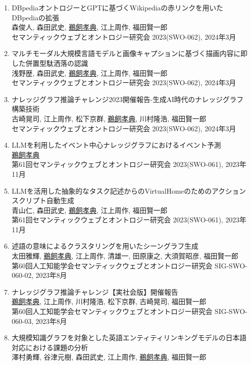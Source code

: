 \documentclass[dvipdfmx]{jlreq}
\begin{document}
\begin{enumerate}
\begin{enumerate}
\begin{enumerate}[label=\arabic*,align=right, labelsep=3pt]
2024年度人工知能学会全国大会論文集（第38回）, 2024年5月
\item DBpediaオントロジーとGPTに基づくWikipediaの赤リンクを用いたDBpediaの拡張\\
森俊人, 森田武史, \underline{鵜飼孝典}, 江上周作, 福田賢一郎\\
セマンティックウェブとオントロジー研究会 2023(SWO-062), 2024年3月
\item マルチモーダル大規模言語モデルと画像キャプションに基づく描画内容に即した併置型駄洒落の認識\\
浅野歴, 森田武史, \underline{鵜飼孝典}, 江上周作, 福田賢一郎\\
セマンティックウェブとオントロジー研究会 2023(SWO-062), 2024年3月
\item ナレッジグラフ推論チャレンジ2023開催報告-生成AI時代のナレッジグラフ構築技術\\
古崎晃司, 江上周作, 松下京群, \underline{鵜飼孝典}, 川村隆浩, 福田賢一郎\\
セマンティックウェブとオントロジー研究会 2023(SWO-062), 2024年3月
\item LLMを利用したイベント中心ナレッジグラフにおけるイベント予測\\
\underline{鵜飼孝典}\\
第61回セマンティックウェブとオントロジー研究会 2023(SWO-061), 2023年11月
\item LLMを活用した抽象的なタスク記述からのVirtualHomeのためのアクションスクリプト自動生成\\
青山仁, 森田武史, \underline{鵜飼孝典}, 江上周作, 福田賢一郎\\
第61回セマンティックウェブとオントロジー研究会 2023(SWO-061), 2023年11月
\item 述語の意味によるクラスタリングを用いたシーングラフ生成\\
太田雅輝, \underline{鵜飼孝典}, 江上周作, 清雄一, 田原康之, 大須賀昭彦, 福田賢一郎\\
第60回人工知能学会セマンティックウェブとオントロジー研究会 SIG-SWO-060-02, 2023年8月
\item ナレッジグラフ推論チャレンジ【実社会版】開催報告\\
\underline{鵜飼孝典}, 江上周作, 川村隆浩, 松下京群, 古崎晃司, 福田賢一郎\\
第60回人工知能学会セマンティックウェブとオントロジー研究会 SIG-SWO-060-03, 2023年8月
\item 大規模知識グラフを対象とした英語エンティティリンキングモデルの日本語対応における課題の分析\\
澤村勇輝, 谷津元樹, 森田武史, 江上周作, \underline{鵜飼孝典}, 福田賢一郎\\

\end{enumerate}
\end{enumerate}
\end{enumerate}
\end{document}
